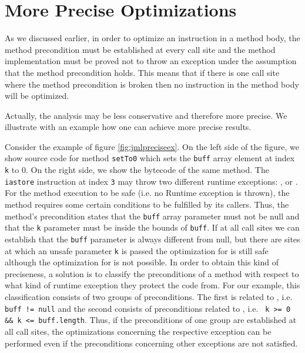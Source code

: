 \section{More Precise Optimizations}

\label{section:optimprecise}

As we discussed earlier, in order to optimize an instruction in a method body, the method precondition must be established at every call site and the method implementation must be proved not to throw an exception under the assumption that the method precondition holds. This means that if there is one call site where the method precondition is broken then no instruction in the method body will be optimized.

Actually, the analysis may be less conservative and therefore more precise. We illustrate with an example how
one can achieve more precise results.

Consider the example of figure \ref{fig:jmlpreciseex}. On the left side of the figure, we show source code for method \verb!setTo0! which sets the \verb!buff! array element at index \verb!k! to 0. On the right side, we show the bytecode of the same method. The \texttt{iastore} instruction at index \texttt{3} may throw two different runtime exceptions: \NullPointerExc, or \ArrIndexOutOfBoundExc. For the method execution to be safe (i.e. no Runtime exception is thrown), the method requires some certain conditions to be fulfilled by its callers. Thus, the method's precondition states that the \verb!buff! array parameter must not be null and that the \verb!k! parameter must be inside the bounds of \verb!buff!. If at all call sites we can establish that the \verb!buff! parameter is always different from null, but there are sites at which an unsafe parameter \verb!k! is passed the optimization for \NullPointerExc is still safe although the optimization for \ArrIndexOutOfBoundExc is not possible. In order to obtain this kind of preciseness, a solution is to classify the preconditions of a method with respect to what kind of runtime exception they protect the code from. For our example, this classification consists of two groups of preconditions. The first is related to \NullPointerExc, i.e. \texttt{buff != null} and the second consists of preconditions related to \ArrIndexOutOfBoundExc, i.e. \verb! k >= 0 && k <= buff.length!. Thus, if the preconditions of one group are established at all call sites, the optimizations concerning the respective exception can be performed even if the preconditions concerning other exceptions are not satisfied.

